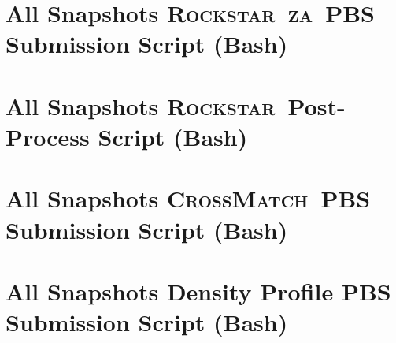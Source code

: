 \documentclass[12pt]{report}
\newcommand{\za}{\textsc{za}}
\newcommand{\rockstar}{\textsc{Rockstar}}
\newcommand{\crossmatch}{\textsc{CrossMatch}}
\begin{document}
\begin{appendices}
	\section{All Snapshots \rockstar\ \za\ PBS Submission Script (Bash)}
	\label{app:run_za}
	
	\section{All Snapshots \rockstar\ Post-Process Script (Bash)}
	\label{app:postprocess_all}
	
	\section{All Snapshots \crossmatch\ PBS Submission Script (Bash)}
	\label{app:run_crossmatch}
	
	\section{All Snapshots Density Profile PBS Submission Script (Bash)}
	\label{app:run_density_profile}
	

\end{appendices}
\end{document}
